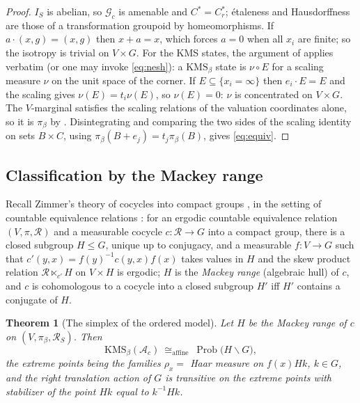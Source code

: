 \documentclass[11pt]{amsart}
\numberwithin{equation}{section}
\newtheorem{theorem}{Theorem}[section]
\theoremstyle{definition}
\theoremstyle{remark}
\newcommand{\cA}{\mathcal{A}}
\newcommand{\cG}{\mathcal{G}}
\newcommand{\cR}{\mathcal{R}}
\newcommand{\Prob}{\operatorname{Prob}}
\begin{document}
\begin{proof}
$I_S$ is abelian, so $\cG_c$ is amenable and $C^*=C^*_r$; \'etaleness and Hausdorffness are
those of a transformation groupoid by homeomorphisms. If $a\cdot(x,g)=(x,g)$ then $x+a=x$,
which forces $a=0$ when all $x_i$ are finite; so the isotropy is trivial on $V\times G$. For
the KMS states, the argument of \cite[Prop.~2.8]{Main} applies verbatim (or one may invoke
\eqref{eq:nesh}): a $\mathrm{KMS}_\beta$ state is $\nu\circ E$ for a scaling measure $\nu$
on the unit space of the corner. If $E\subseteq\{x_i=\infty\}$ then $e_i\cdot E=E$ and the
scaling gives $\nu(E)=t_i\nu(E)$, so $\nu(E)=0$: $\nu$ is concentrated on $V\times G$. The
$V$-marginal satisfies the scaling relations of the valuation coordinates alone, so it is
$\pi_\beta$ by \cite[Lem.~2.10]{Main}. Disintegrating and comparing the two sides of the
scaling identity on sets $B\times C$, using $\pi_\beta(B+e_j)=t_j\pi_\beta(B)$, gives
\eqref{eq:equiv}.
\end{proof}

\subsection{Classification by the Mackey range}

Recall Zimmer's theory of cocycles into compact groups \cite[Ch.~4 and 9]{Zimmer}, in the
setting of countable equivalence relations \cite{FM}: for an ergodic countable equivalence
relation $(V,\pi,\cR)$ and a measurable cocycle
$c:\cR\to G$ into a compact group, there is a closed subgroup $H\le G$, unique up to
conjugacy, and a measurable $f:V\to G$ such that $c'(y,x)=f(y)^{-1}c(y,x)f(x)$ takes values in
$H$ and the skew product relation $\cR\ltimes_{c'}H$ on $V\times H$ is ergodic; $H$ is the
\emph{Mackey range} (algebraic hull) of $c$, and $c$ is cohomologous to a cocycle into a
closed subgroup $H'$ iff $H'$ contains a conjugate of $H$.

\begin{theorem}[The simplex of the ordered model]\label{thm:simplex}
Let $H$ be the Mackey range of $c$ on $(V,\pi_\beta,\cR_S)$. Then
\[
\mathrm{KMS}_\beta(\cA_c)\ \cong_{\mathrm{affine}}\ \Prob\bigl(H\backslash G\bigr),
\]
the extreme points being the families $\rho_x=$ Haar measure on $f(x)Hk$, $k\in G$, and the
right translation action of $G$ is transitive on the extreme points with stabilizer of the
point $Hk$ equal to $k^{-1}Hk$.
\end{theorem}
\end{document}
